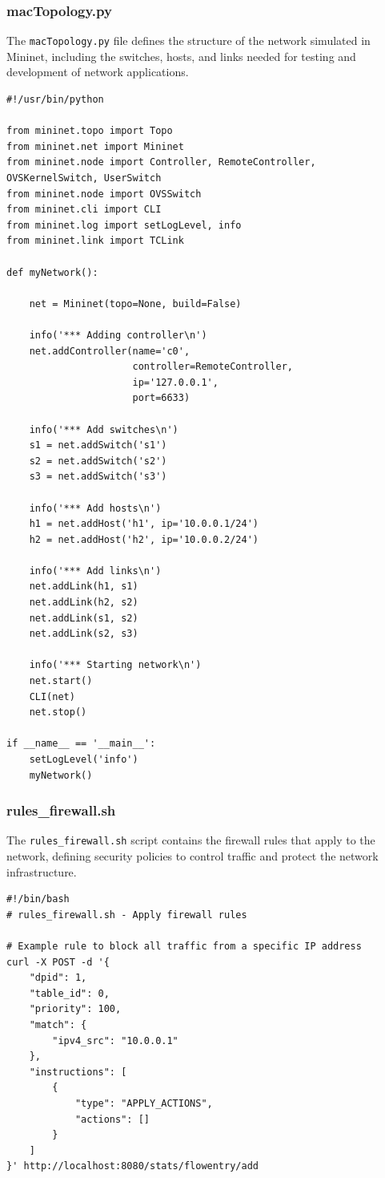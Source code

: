 \documentclass[a4paper,12pt]{article}
\begin{document}
\subsubsection{macTopology.py}
The \texttt{macTopology.py} file defines the structure of the network simulated in Mininet, including the switches, hosts, and links needed for testing and development of network applications.

\begin{verbatim}
#!/usr/bin/python

from mininet.topo import Topo
from mininet.net import Mininet
from mininet.node import Controller, RemoteController, OVSKernelSwitch, UserSwitch
from mininet.node import OVSSwitch
from mininet.cli import CLI
from mininet.log import setLogLevel, info
from mininet.link import TCLink

def myNetwork():

    net = Mininet(topo=None, build=False)

    info('*** Adding controller\n')
    net.addController(name='c0',
                      controller=RemoteController,
                      ip='127.0.0.1',
                      port=6633)

    info('*** Add switches\n')
    s1 = net.addSwitch('s1')
    s2 = net.addSwitch('s2')
    s3 = net.addSwitch('s3')

    info('*** Add hosts\n')
    h1 = net.addHost('h1', ip='10.0.0.1/24')
    h2 = net.addHost('h2', ip='10.0.0.2/24')

    info('*** Add links\n')
    net.addLink(h1, s1)
    net.addLink(h2, s2)
    net.addLink(s1, s2)
    net.addLink(s2, s3)

    info('*** Starting network\n')
    net.start()
    CLI(net)
    net.stop()

if __name__ == '__main__':
    setLogLevel('info')
    myNetwork()
\end{verbatim}

\subsubsection{rules\_firewall.sh}
The \texttt{rules\_firewall.sh} script contains the firewall rules that apply to the network, defining security policies to control traffic and protect the network infrastructure.

\begin{verbatim}
#!/bin/bash
# rules_firewall.sh - Apply firewall rules

# Example rule to block all traffic from a specific IP address
curl -X POST -d '{
    "dpid": 1,
    "table_id": 0,
    "priority": 100,
    "match": {
        "ipv4_src": "10.0.0.1"
    },
    "instructions": [
        {
            "type": "APPLY_ACTIONS",
            "actions": []
        }
    ]
}' http://localhost:8080/stats/flowentry/add
\end{verbatim}
\end{document}
